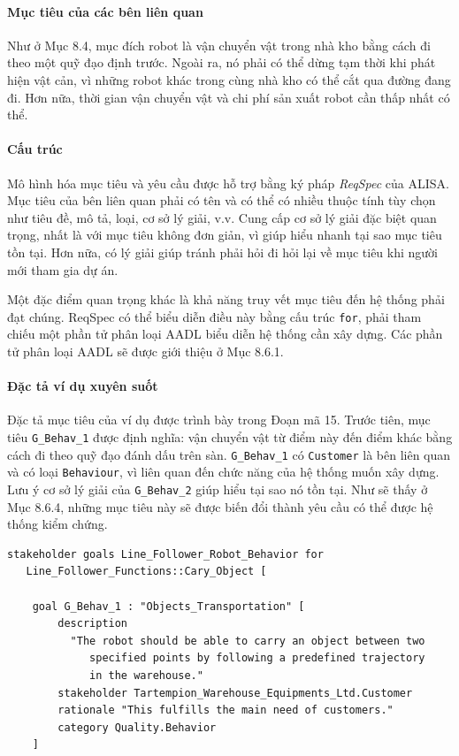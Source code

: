 \paragraph*{Mục tiêu của các bên liên quan}
Như ở Mục 8.4, mục đích robot là vận chuyển vật trong nhà kho bằng cách đi theo một quỹ đạo định trước. Ngoài ra, nó phải có thể dừng tạm thời khi phát hiện vật cản, vì những robot khác trong cùng nhà kho có thể cắt qua đường đang đi. Hơn nữa, thời gian vận chuyển vật và chi phí sản xuất robot cần thấp nhất có thể.

\paragraph*{Cấu trúc}
Mô hình hóa mục tiêu và yêu cầu được hỗ trợ bằng ký pháp \emph{ReqSpec} của ALISA. Mục tiêu của bên liên quan phải có tên và có thể có nhiều thuộc tính tùy chọn như tiêu đề, mô tả, loại, cơ sở lý giải, v.v. Cung cấp cơ sở lý giải đặc biệt quan trọng, nhất là với mục tiêu không đơn giản, vì giúp hiểu nhanh tại sao mục tiêu tồn tại. Hơn nữa, có lý giải giúp tránh phải hỏi đi hỏi lại về mục tiêu khi người mới tham gia dự án.

Một đặc điểm quan trọng khác là khả năng truy vết mục tiêu đến hệ thống phải đạt chúng. ReqSpec có thể biểu diễn điều này bằng cấu trúc \texttt{for}, phải tham chiếu một phần tử phân loại AADL biểu diễn hệ thống cần xây dựng. Các phần tử phân loại AADL sẽ được giới thiệu ở Mục 8.6.1.

\paragraph*{Đặc tả ví dụ xuyên suốt}
Đặc tả mục tiêu của ví dụ được trình bày trong Đoạn mã 15. Trước tiên, mục tiêu \texttt{G\_Behav\_1} được định nghĩa: vận chuyển vật từ điểm này đến điểm khác bằng cách đi theo quỹ đạo đánh dấu trên sàn. \texttt{G\_Behav\_1} có \texttt{Customer} là bên liên quan và có loại \texttt{Behaviour}, vì liên quan đến chức năng của hệ thống muốn xây dựng. Lưu ý cơ sở lý giải của \texttt{G\_Behav\_2} giúp hiểu tại sao nó tồn tại. Như sẽ thấy ở Mục 8.6.4, những mục tiêu này sẽ được biến đổi thành yêu cầu có thể được hệ thống kiểm chứng.
\begin{verbatim}
stakeholder goals Line_Follower_Robot_Behavior for
   Line_Follower_Functions::Cary_Object [

    goal G_Behav_1 : "Objects_Transportation" [
        description
          "The robot should be able to carry an object between two
             specified points by following a predefined trajectory
             in the warehouse."
        stakeholder Tartempion_Warehouse_Equipments_Ltd.Customer
        rationale "This fulfills the main need of customers."
        category Quality.Behavior
    ]
\end{verbatim}

